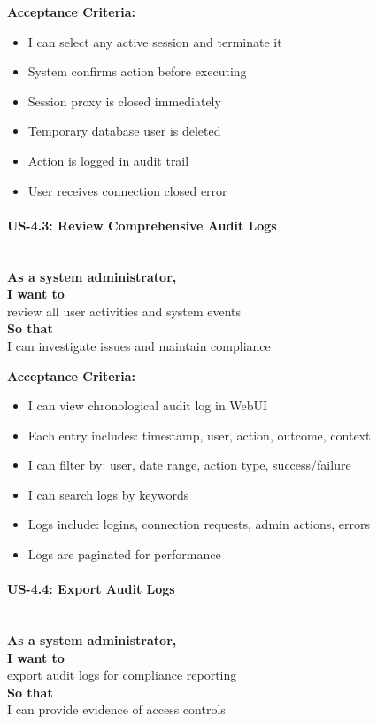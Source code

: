 \noindent\textbf{Acceptance Criteria:}
\begin{itemize}
    \item I can select any active session and terminate it
    \item System confirms action before executing
    \item Session proxy is closed immediately
    \item Temporary database user is deleted
    \item Action is logged in audit trail
    \item User receives connection closed error
\end{itemize}

\paragraph{US-4.3: Review Comprehensive Audit Logs}
\mbox{}\\[0.5em]

\noindent\textbf{As a system administrator,} \\
\textbf{I want to} \\
review all user activities and system events \\
\textbf{So that} \\
I can investigate issues and maintain compliance

\noindent\textbf{Acceptance Criteria:}
\begin{itemize}
    \item I can view chronological audit log in WebUI
    \item Each entry includes: timestamp, user, action, outcome, context
    \item I can filter by: user, date range, action type, success/failure
    \item I can search logs by keywords
    \item Logs include: logins, connection requests, admin actions, errors
    \item Logs are paginated for performance
\end{itemize}

\paragraph{US-4.4: Export Audit Logs}
\mbox{}\\[0.5em]

\noindent\textbf{As a system administrator,} \\
\textbf{I want to} \\
export audit logs for compliance reporting \\
\textbf{So that} \\
I can provide evidence of access controls

